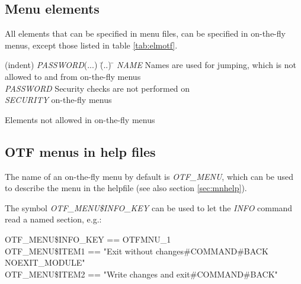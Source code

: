 \documentclass[a4paper]{book}
\renewcommand{\indent}{\hspace*{5mm}}
\begin{document}
\subsection{Menu elements}
\label{subsubsec:mylabel65}

All elements that can be specified in menu files, can be specified in 
on-the-fly menus, except those listed in table \ref{tab:elmotf}.

\begin{table}[h!tb]
\begin{minipage}[h!tb]{\textwidth}
\begin{tabbing}
(indent) \= \textsl{PASSWORD}(...) \= (..) \= \kill
 \> \textsl{NAME}     \> Names are used for jumping, which is not \\
 \>                   \> \> allowed to and from on-the-fly menus \\
 \> \textsl{PASSWORD} \> Security checks are not performed on \\
 \> \textsl{SECURITY} \> \> on-the-fly menus \\
\end{tabbing}
\caption{Elements not allowed in on-the-fly menus}\label{tab:elmotf}
\end{minipage}
\end{table}

\subsection{OTF menus in help files}
\label{subsec:otfhelp}

The name of an on-the-fly menu by default is \textsl{OTF{\_}MENU}, which can be used to describe the menu in the helpfile (see also section \ref{sec:mnhelp}).

The symbol \textsl{OTF{\_}MENU{\$}INFO{\_}KEY} can be used to let the \textsl{INFO} command read a named section, e.g.: \\
\begin{small}
\begin{texttt}
\indent{\$} OTF{\_}MENU{\$}INFO{\_}KEY == OTFMNU{\_}1 \\
\indent{\$} OTF{\_}MENU{\$}ITEM1 == "Exit without changes{\#}COMMAND{\#}BACK NOEXIT{\_}MODULE" \\
\indent{\$} OTF{\_}MENU{\$}ITEM2 == "Write changes and exit{\#}COMMAND{\#}BACK" \\
\end{texttt}
\end{small}
\end{document}
